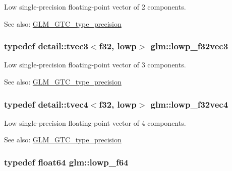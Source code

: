 Low single-precision floating-point vector of 2 components. \begin{Desc}
\item[See also:]\hyperlink{group__gtc__type__precision}{GLM\_\-GTC\_\-type\_\-precision} \end{Desc}
\hypertarget{group__gtc__type__precision_g1f878d91a5f5ab92c756244b62af7248}{
\subsubsection[lowp\_\-f32vec3]{\setlength{\rightskip}{0pt plus 5cm}typedef detail::tvec3$<$f32, lowp$>$ {\bf glm::lowp\_\-f32vec3}}}
\label{group__gtc__type__precision_g1f878d91a5f5ab92c756244b62af7248}


Low single-precision floating-point vector of 3 components. \begin{Desc}
\item[See also:]\hyperlink{group__gtc__type__precision}{GLM\_\-GTC\_\-type\_\-precision} \end{Desc}
\hypertarget{group__gtc__type__precision_g59f7292d7ed0b7df72e6aa31010e2648}{
\subsubsection[lowp\_\-f32vec4]{\setlength{\rightskip}{0pt plus 5cm}typedef detail::tvec4$<$f32, lowp$>$ {\bf glm::lowp\_\-f32vec4}}}
\label{group__gtc__type__precision_g59f7292d7ed0b7df72e6aa31010e2648}


Low single-precision floating-point vector of 4 components. \begin{Desc}
\item[See also:]\hyperlink{group__gtc__type__precision}{GLM\_\-GTC\_\-type\_\-precision} \end{Desc}
\hypertarget{group__gtc__type__precision_g59839f4bf6b97c93b0def577890bbfb8}{
\subsubsection[lowp\_\-f64]{\setlength{\rightskip}{0pt plus 5cm}typedef float64 {\bf glm::lowp\_\-f64}}}
\label{group__gtc__type__precision_g59839f4bf6b97c93b0def577890bbfb8}


